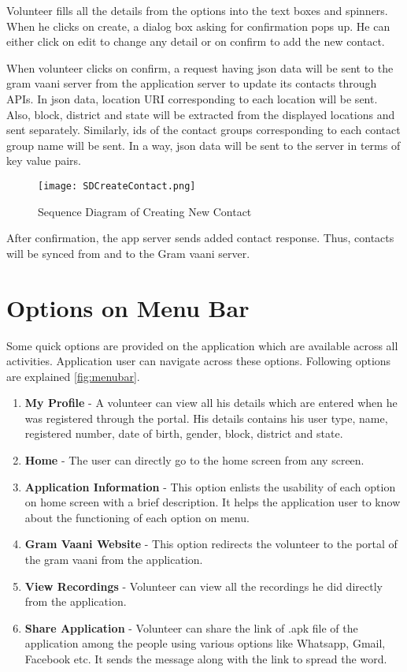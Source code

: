 \begin{itemize}
Volunteer fills all the details from the options into the text boxes and spinners. When he clicks on create, a dialog box asking for confirmation pops up. He can either click on edit to change any detail or on confirm to add the new contact.

When volunteer clicks on confirm, a request having json data will be sent to the  gram vaani server from the application server to update its contacts through APIs. In json data, location URI corresponding to each location will be sent. Also, block, district and state will be extracted from the displayed locations and sent separately. Similarly, ids of the contact groups corresponding to each contact group name will be sent. In a way, json data will be sent to the server in terms of key value pairs.

\begin{figure}[H]
    \centering
	\texttt{[image: SDCreateContact.png]}
    \caption{ Sequence Diagram of Creating New Contact}
    \label{fig:Sequence Diagram of Creating New Contact}
\end{figure}

 After confirmation, the app server sends added contact response. Thus, contacts will be synced from and to the Gram vaani server.

\section {Options on Menu Bar}

Some quick options are provided on the application which are available across all activities. Application  user can navigate across these options. Following options are explained \ref{fig:menubar}.
\begin{enumerate}
\item \textbf {My Profile} - A volunteer can view all his details which are entered when he was registered through the portal. His details contains his user type, name, registered number, date of birth, gender, block, district and state.
\item \textbf{Home} - The user can directly go to the home screen from any screen.
\item \textbf{Application Information} - This option enlists the usability of each option on home screen with a brief description. It helps the application user to know about the functioning of each option on menu.
\item \textbf{Gram Vaani Website} - This option redirects the volunteer to the portal of the gram vaani from the application.
\item \textbf{View Recordings} - Volunteer can view all the recordings he did directly from the application.
\item \textbf{Share Application} - Volunteer can share the link of .apk file of the application among the people using various options like Whatsapp, Gmail, Facebook etc. It sends the message along with the link to spread the word.
\end{enumerate}



\end{itemize}
